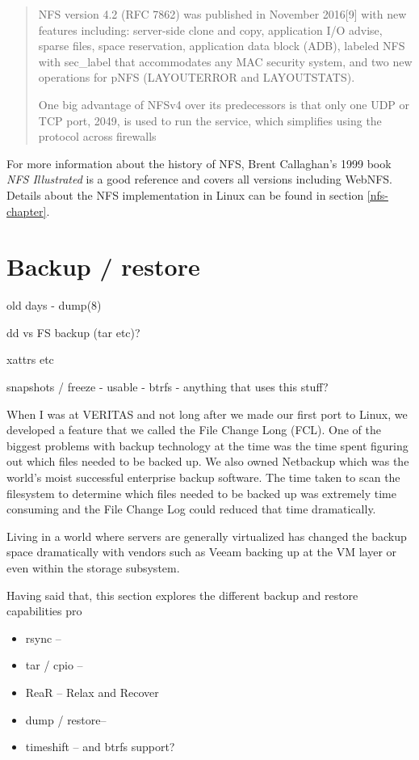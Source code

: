 \begin{quote}
NFS version 4.2 (RFC 7862) was published in November 2016[9] with new features including: server-side clone and copy, application I/O advise, sparse files, space reservation, application data block (ADB), labeled NFS with sec\_label that accommodates any MAC security system, and two new operations for pNFS (LAYOUTERROR and LAYOUTSTATS).

One big advantage of NFSv4 over its predecessors is that only one UDP or TCP port, 2049, is used to run the service, which simplifies using the protocol across firewalls
\end{quote}

For more information about the history of NFS, Brent Callaghan's 1999 book \textit{NFS Illustrated}\cite{nfs}  is a good reference and covers all versions including WebNFS. Details about the NFS implementation in Linux can be found in section \ref{nfs-chapter}.


\section{Backup / restore}\label{backups}

old days - dump(8)

dd vs FS backup (tar etc)?

xattrs etc

snapshots / freeze - usable - btrfs - anything that uses this stuff?

When I was at VERITAS and not long after we made our first port to Linux, we developed a feature that we called the File Change Long (FCL). One of the biggest problems with backup technology at the time was the time spent figuring out which files needed to be backed up. We also owned Netbackup which was the world's moist successful enterprise backup software. The time taken to scan the filesystem to determine which files needed to be backed up was extremely time consuming and the File Change Log could reduced that time dramatically.

Living in a world where servers are generally virtualized has changed the backup space dramatically with vendors such as Veeam backing up at the VM layer or even within the storage subsystem.

Having said that, this section explores the different backup and restore capabilities pro

\begin{itemize}
	\item rsync --
	\item tar / cpio --
	\item ReaR -- Relax and Recover 
	\item dump / restore--
	\item timeshift -- and btrfs support?
\end{itemize}

